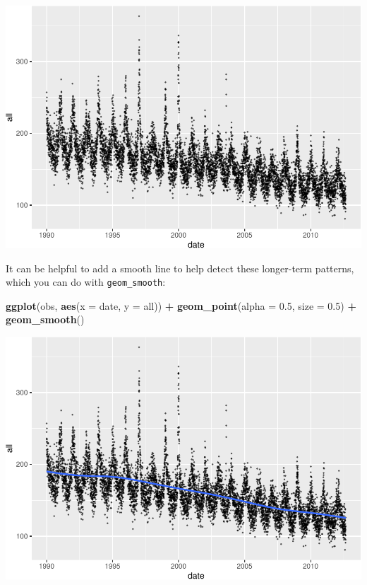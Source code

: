 \documentclass[
]{book}
\newenvironment{Shaded}{\begin{snugshade}}{\end{snugshade}}
\newcommand{\DataTypeTok}[1]{\textcolor[rgb]{0.13,0.29,0.53}{#1}}
\newcommand{\FloatTok}[1]{\textcolor[rgb]{0.00,0.00,0.81}{#1}}
\newcommand{\KeywordTok}[1]{\textcolor[rgb]{0.13,0.29,0.53}{\textbf{#1}}}
\newcommand{\NormalTok}[1]{#1}
\newcommand{\OperatorTok}[1]{\textcolor[rgb]{0.81,0.36,0.00}{\textbf{#1}}}
\newcommand{\StringTok}[1]{\textcolor[rgb]{0.31,0.60,0.02}{#1}}
\begin{document}
\includegraphics{adv_epi_analysis_files/figure-latex/unnamed-chunk-14-1.pdf}

It can be helpful to add a smooth line to help detect these longer-term
patterns, which you can do with \texttt{geom\_smooth}:

\begin{Shaded}
\begin{Highlighting}[]
\KeywordTok{ggplot}\NormalTok{(obs, }\KeywordTok{aes}\NormalTok{(}\DataTypeTok{x =}\NormalTok{ date, }\DataTypeTok{y =}\NormalTok{ all)) }\OperatorTok{+}\StringTok{ }
\StringTok{  }\KeywordTok{geom_point}\NormalTok{(}\DataTypeTok{alpha =} \FloatTok{0.5}\NormalTok{, }\DataTypeTok{size =} \FloatTok{0.5}\NormalTok{) }\OperatorTok{+}\StringTok{ }
\StringTok{  }\KeywordTok{geom_smooth}\NormalTok{()}
\end{Highlighting}
\end{Shaded}

\includegraphics{adv_epi_analysis_files/figure-latex/unnamed-chunk-15-1.pdf}
\end{document}

